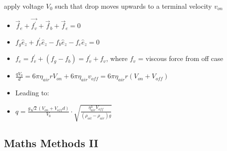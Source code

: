 \documentclass{article}
\begin{document}
apply voltage $V_0$ such that drop moves upwards to a terminal velocity \(v_{on}\)
\begin{itemize}
    \item \(\vec f_e + \vec{f_v^\prime} + \vec f_b + \vec f_e = 0\)
    \item \(f_g\hat e_z + f_v^\prime\hat e_z - f_b\hat e_z - f_e\hat e_z = 0\)
    \item \(f_e = f_v^\prime + (f_g - f_b) = f_v^\prime + f_v\), where \(f_v\) = viscous force from off case
    \item \(\frac{qV_0}{d} = 6\pi\eta_{air}rV_{on} + 6\pi\eta_{air}v_{off} = 6\pi\eta_{air}r(V_{on}+V_{off})\)
    \item Leading to: 
    \item \(\boxed{q=\frac{g\sqrt{2}(V_{on}+V_{off}d)}{V_0}\cdot\sqrt{\frac{\eta_{air}^3V_{off}}{(\rho_{oil}-\rho_{air})g}}}\)
\end{itemize}

\subsection{Maths Methods II}
\end{document}
